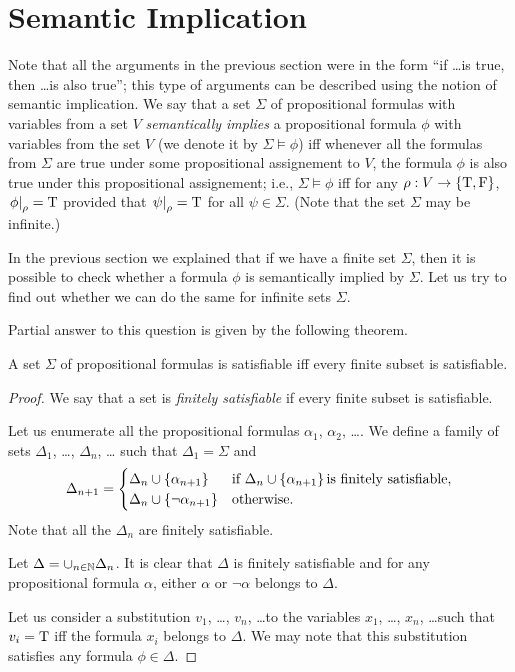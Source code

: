 \section{Semantic Implication}
Note that all the arguments in the previous section were in the form
``if \dots is true, then \dots is also true''; this type of arguments
can be described using the notion of semantic implication.
We say that a set $\Sigma$ of propositional formulas with variables from a set
$V$ \emph{semantically implies} a propositional formula $\phi$ with variables
from the set $V$ (we denote it by $\Sigma \models \phi$)
iff whenever all the formulas from $\Sigma$ are true under some propositional
assignement to $V$, the formula $\phi$ is also true under this propositional
assignement; i.e.,
$\Sigma \models \phi$ iff for any $\rho : V \to \set{\ltrue, \lfalse}$,
$\left. {\phi} \right\rvert_{\rho} = \text{T}$ provided that
$\left. {\psi} \right\rvert_{\rho} = \text{T}$ for all $\psi \in \Sigma$.
(Note that the set $\Sigma$ may be infinite.)

In the previous section we explained that if we have a finite set $\Sigma$,
then it is possible to check whether a formula $\phi$ is semantically implied
by $\Sigma$. Let us try to find out whether we can do the same for infinite
sets $\Sigma$.

Partial answer to this question is given by the following theorem.
\begin{theorem}
  A set $\Sigma$ of propositional formulas is satisfiable iff every finite
  subset is satisfiable.
\end{theorem}
\begin{proof}
  We say that a set is \emph{finitely satisfiable} if every finite subset
  is satisfiable.


  Let us enumerate all the propositional formulas $\alpha_1$, $\alpha_2$, \dots.
  We define a family of sets $\Delta_1$, \dots, $\Delta_n$, \dots
  such that $\Delta_1 = \Sigma$ and
  \[
    \Delta_{n + 1} =
    \begin{cases}
      \Delta_n \cup \set{\alpha_{n + 1}} & \text{if }
        \Delta_n \cup \set{\alpha_{n + 1}} \text{is finitely satisfiable,} \\
      \Delta_n \cup \set{\lnot \alpha_{n + 1}} & \text{otherwise.}
    \end{cases}
  \]
  Note that all the $\Delta_n$ are finitely satisfiable.

  Let $\Delta = \cup_{n \in \mathbb{N}} \Delta_n$. It is clear that $\Delta$ is
  finitely satisfiable and for any propositional formula $\alpha$,
  either $\alpha$ or $\lnot \alpha$ belongs to $\Delta$.

  Let us consider a substitution $v_1$, \dots, $v_n$, \dots to the variables
  $x_1$, \dots, $x_n$, \dots such that $v_i = \text{T}$ iff the formula $x_i$
  belongs to $\Delta$. We may note that this substitution satisfies any
  formula $\phi \in \Delta$.
\end{proof}

